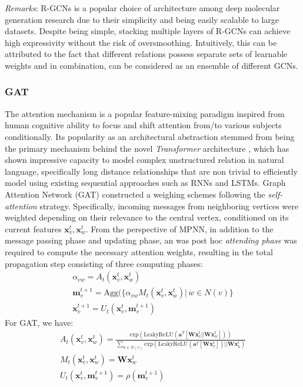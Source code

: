 \textit{Remarks}: R-GCNs is a popular choice of architecture among deep
molecular generation research due to their simplicity and being easily scalable to
large datasets. Despite being simple, stacking multiple layers of R-GCNs can
achieve high expressivity without the risk of oversmoothing. Intuitively, this
can be attributed to the fact that different relations possess separate sets of
learnable weights and in combination, can be considered as an ensemble of different GCNs.

\subsubsection{GAT \citep{velickovicGraphAttentionNetworks2018}}

The attention mechanism is a popular feature-mixing paradigm inspired from human
cognitive ability to focus and shift attention from/to various subjects
conditionally. Its popularity as an architectural abstraction stemmed from being
the primary mechanism behind the novel \textit{Transformer} architecture
\citep{vaswaniAttentionAllYou2017}, which has shown impressive capacity to model
complex unstructured relation in natural language, specifically long distance
relationships that are non trivial to efficiently model using existing
sequential approaches such as RNNs and LSTMs. Graph Attention Network (GAT)
\citep{velickovicGraphAttentionNetworks2018} constructed a weighing schemes
following the \textit{self-attention} strategy. Specifically, incoming messages
from neighboring vertices were weighted depending on their relevance to the
central vertex, conditioned on its current features $\mathbf{x}_{v}^t,
\mathbf{x}_w^t$. From the perspective of MPNN, in addition to the message
passing phase and updating phase, an was post hoc \textit{attending phase} was
required to compute the necessary attention weights, resulting in the total
propagation step consisting of three computing phases:
\begin{gather*}
  \alpha_{vw} = A_t(\mathbf{x}_{v}^t, \mathbf{x}_{w}^t)
  \\
  \mathbf{m}_v^{t+1} = \text{Agg}(\{\alpha_{vw}M_t(\mathbf{x}_{v}^t,
  \mathbf{x}_w^t) | \, w \in N(v)\}
  \\
  \mathbf{x}_v^{t+1} = U_t(\mathbf{x}_v^t, \mathbf{m}_v^{t+1})
\end{gather*}
For GAT, we have:
\begin{gather*}
  A_t(\mathbf{x}_{v}^t, \mathbf{x}_{w}^t) = \frac{
  \text{exp}(\text{LeakyReLU}(\mathbf{a}^T[\mathbf{W}\mathbf{x}_{v}^t ||
  \mathbf{W}\mathbf{x}_{w}^t]))
  }{ \sum_{k \in N(v)} \text{exp}(\text{LeakyReLU}(\mathbf{a}^T
    [\mathbf{W}\mathbf{x}_{v}^t]) || \mathbf{W} \mathbf{x}_{k}^t)
  } \\
  M_t(\mathbf{x}_v^t, \mathbf{x}_w^t) = \mathbf{W} \mathbf{x}_w^t \\
  U_t(\mathbf{x}_v^t, \mathbf{m}_v^{t+1}) = \rho(\mathbf{m}_v^{t+1})
\end{gather*}

